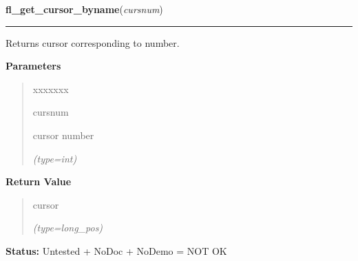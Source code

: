     \label{xformslib:flcursor:fl_get_cursor_byname}

    \vspace{0.5ex}

\hspace{.8\funcindent}\begin{boxedminipage}{\funcwidth}

    \raggedright \textbf{fl\_get\_cursor\_byname}(\textit{cursnum})

    \vspace{-1.5ex}

    \rule{\textwidth}{0.5\fboxrule}
\setlength{\parskip}{2ex}
    Returns cursor corresponding to number.

\setlength{\parskip}{1ex}
      \textbf{Parameters}
      \vspace{-1ex}

      \begin{quote}
        \begin{Ventry}{xxxxxxx}

          \item[cursnum]

          cursor number

            {\it (type=int)}

        \end{Ventry}

      \end{quote}

      \textbf{Return Value}
    \vspace{-1ex}

      \begin{quote}
      cursor

      {\it (type=long\_pos)}

      \end{quote}

\textbf{Status:} Untested + NoDoc + NoDemo = NOT OK



    \end{boxedminipage}

    \label{xformslib:flcursor:fl_reset_cursor}

    \vspace{0.5ex}


